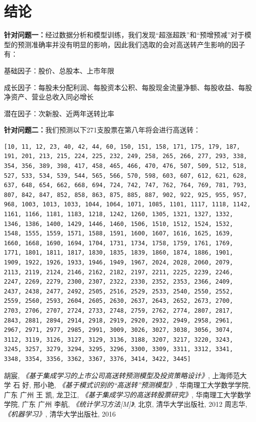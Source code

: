 \documentclass[lang=cn,12pt]{elegantpaper}
\begin{document}
\section{结论}

\textbf{针对问题一：}经过数据分析和模型训练，我们发现“超涨超跌”和“预增预减”对于模型的预测准确率并没有明显的影响，因此我们选取的会对高送转产生影响的因子有：

基础因子：股价、总股本、上市年限

成长因子：每股未分配利润、每股资本公积、每股现金流量净额、每股收益、每股净资产、营业总收入同必增长

潜在因子：次新股、近两年送转比率

\textbf{针对问题二：}我们预测以下271支股票在第八年将会进行高送转：
\begin{lstlisting}
[10, 11, 12, 23, 40, 42, 44, 60, 150, 151, 158, 171, 175, 179, 187, 191, 201, 213, 215, 224, 225, 232, 249, 258, 265, 266, 277, 293, 338, 354, 356, 389, 398, 417, 458, 465, 466, 470, 476, 507, 509, 512, 518, 527, 533, 534, 539, 544, 565, 566, 570, 598, 603, 607, 612, 621, 628, 637, 648, 654, 662, 668, 694, 724, 742, 747, 762, 764, 769, 781, 793, 807, 842, 847, 852, 858, 863, 875, 885, 887, 902, 922, 925, 955, 957, 968, 1003, 1013, 1033, 1044, 1064, 1071, 1085, 1101, 1117, 1118, 1142, 1161, 1166, 1181, 1183, 1218, 1242, 1260, 1305, 1321, 1327, 1332, 1346, 1386, 1400, 1429, 1446, 1460, 1506, 1510, 1512, 1524, 1532, 1548, 1555, 1559, 1571, 1588, 1591, 1600, 1607, 1616, 1625, 1639, 1660, 1668, 1690, 1694, 1704, 1731, 1734, 1758, 1759, 1761, 1769, 1771, 1801, 1811, 1817, 1830, 1835, 1839, 1860, 1874, 1886, 1901, 1909, 1922, 1926, 1933, 1946, 1949, 1967, 2024, 2028, 2060, 2079, 2113, 2119, 2124, 2146, 2162, 2182, 2197, 2211, 2225, 2239, 2246, 2247, 2269, 2279, 2300, 2307, 2322, 2330, 2352, 2353, 2366, 2409, 2437, 2438, 2477, 2492, 2505, 2516, 2529, 2533, 2540, 2550, 2552, 2559, 2560, 2593, 2604, 2605, 2630, 2637, 2643, 2652, 2673, 2700, 2703, 2706, 2707, 2724, 2733, 2748, 2759, 2762, 2774, 2807, 2817, 2843, 2881, 2894, 2914, 2918, 2919, 2920, 2932, 2949, 2958, 2961, 2967, 2971, 2977, 2985, 2991, 3009, 3026, 3027, 3038, 3056, 3074, 3112, 3119, 3126, 3127, 3129, 3136, 3188, 3207, 3217, 3220, 3243, 3245, 3257, 3279, 3294, 3295, 3296, 3300, 3309, 3311, 3312, 3341, 3348, 3354, 3356, 3362, 3367, 3376, 3414, 3422, 3445]
\end{lstlisting}



\begin{thebibliography}{5}
	胡宸,
	\textit{《基于集成学习的上市公司高送转预测模型及投资策略设计》},
	上海师范大学
	石 好,
	邢小艳,
	\textit{《基于模式识别的“高送转”预测模型》},
	华南理工大学数学学院,
	广东 广州
	王 凯,
	龙卫江,
	\textit{《基于集成学习的高送转股票研究》},
	华南理工大学数学学院,
	广东 广州
	李航,
	\textit{《统计学习方法[M]》},
	北京,
	清华大学出版社,
	2012
	周志华,
	\textit{《机器学习》},
	清华大学出版社,
	2016
\end{thebibliography}
\end{document}

